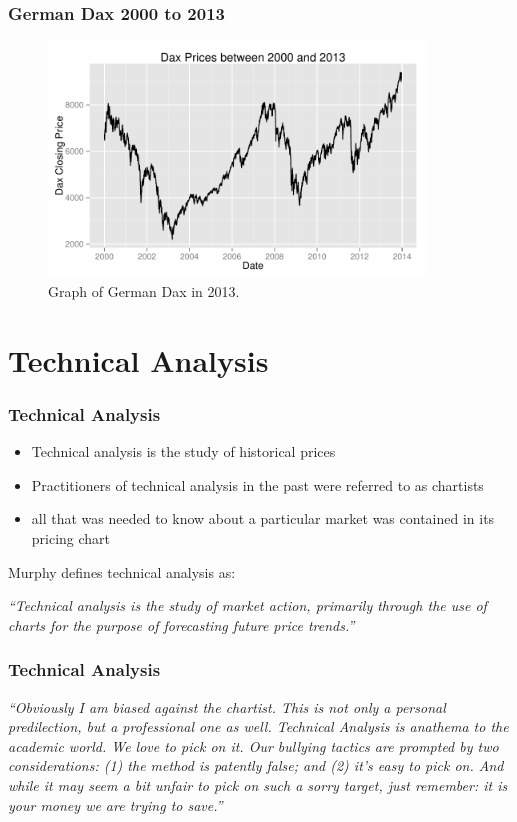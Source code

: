 \documentclass{beamer}
\begin{document}
\begin{frame}
\frametitle{German Dax 2000 to 2013}
\begin{figure}
\centering
\includegraphics[width=10cm]{../Figures/chp3_dax_2000_2013}
\caption{Graph of German Dax in 2013.}
\label{fig:chp3_dax_2000_2013}
\end{figure}

\end{frame}

\section{Technical Analysis} %

\begin{frame}
\frametitle{Technical Analysis}
\begin{itemize}
\item Technical analysis is the study of historical prices
\item Practitioners of technical analysis in the past were referred to as chartists
\item all that was needed to know about a particular market was contained in its pricing chart
\end{itemize}

Murphy defines technical analysis as:

\textit{\textquotedblleft Technical analysis is the study of market action, primarily through the use of charts for the purpose of forecasting future price trends.\textquotedblright}

\end{frame}

\begin{frame}
\frametitle{Technical Analysis}

\textit{\textquotedblleft Obviously I am biased against the chartist. This is not only a personal predilection, but a professional one as well. Technical Analysis is anathema to the academic world. We love to pick on it. Our bullying tactics are prompted by two considerations: (1) the method is patently false; and (2) it's easy to pick on. And while it may seem a bit unfair to pick on such a sorry target, just remember: it is your money we are trying to save.\textquotedblright}

\end{frame}
\end{document}
